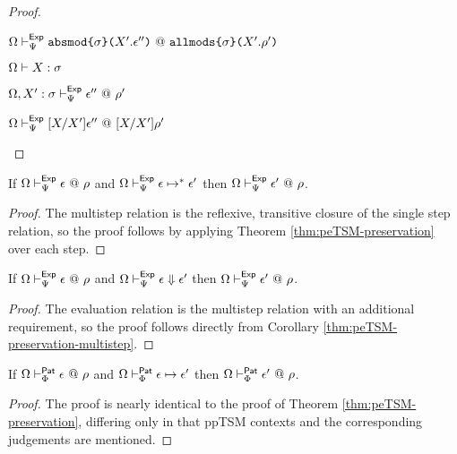 \begin{proof}
\begin{byCases}
\begin{byCases}
\begin{pfsteps*}
        \item $\Omega \vdash_{\Psi}^{\mathsf{Exp}} \texttt{absmod}\texttt{\{}\sigma\texttt{\}(}X'.\epsilon''\texttt{)} ~@~ \texttt{allmods}\texttt{\{}\sigma\texttt{\}(}X'.\rho'\texttt{)}$  
        \item $\Omega \vdash X : \sigma$  
        \item $\Omega, X' : \sigma \vdash_{\Psi}^{\mathsf{Exp}} \epsilon'' ~@~ \rho'$  
        \item $\Omega \vdash_{\Psi}^{\mathsf{Exp}} [X/X']\epsilon'' ~@~ [X/X']\rho'$ 
      \end{pfsteps*}
      \resetpfcounter
  \end{byCases}
\end{byCases}
\end{proof}

\begin{corollary}
\label{thm:peTSM-preservation-multistep}
If $\Omega \vdash_{\Psi}^{\mathsf{Exp}} \epsilon ~@~ \rho$ and $\Omega \vdash_{\Psi}^\mathsf{Exp} \epsilon \mapsto^{*} \epsilon'$ then $\Omega \vdash_{\Psi}^{\mathsf{Exp}} \epsilon' ~@~ \rho$.
\end{corollary}
\begin{proof} The multistep relation is the reflexive, transitive closure of the single step relation, so the proof follows by applying Theorem \ref{thm:peTSM-preservation} over each step. \end{proof}

\begin{corollary}
\label{thm:peTSM-preservation-evaluation}
If $\Omega \vdash_{\Psi}^{\mathsf{Exp}} \epsilon ~@~ \rho$ and $\Omega \vdash_{\Psi}^\mathsf{Exp} \epsilon \Downarrow \epsilon'$ then $\Omega \vdash_{\Psi}^{\mathsf{Exp}} \epsilon' ~@~ \rho$.
\end{corollary}
\begin{proof} The evaluation relation is the multistep relation with an additional requirement, so the proof follows directly from Corollary \ref{thm:peTSM-preservation-multistep}. \end{proof}

\begin{theorem}
\label{thm:ppTSM-preservation}
If $\Omega \vdash_{\Phi}^{\mathsf{Pat}} \epsilon ~@~ \rho$ and $\Omega \vdash_{\Phi}^\mathsf{Pat} \epsilon \mapsto \epsilon'$ then $\Omega \vdash_{\Phi}^{\mathsf{Pat}} \epsilon' ~@~ \rho$.
\end{theorem}
\begin{proof} The proof is nearly identical to the proof of Theorem \ref{thm:peTSM-preservation}, differing only in that ppTSM contexts and the corresponding judgements are mentioned. \end{proof}

